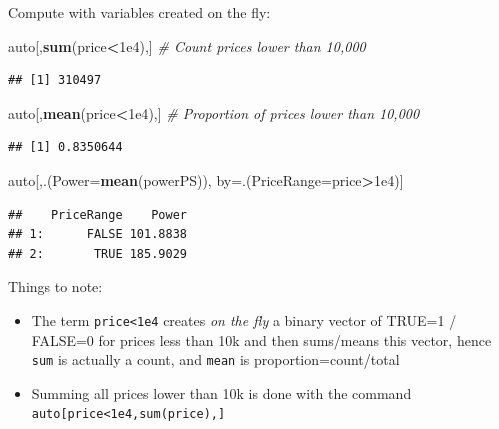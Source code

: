 \documentclass[]{book}
\newenvironment{Shaded}{\begin{snugshade}}{\end{snugshade}}
\newcommand{\KeywordTok}[1]{\textcolor[rgb]{0.13,0.29,0.53}{\textbf{#1}}}
\newcommand{\DataTypeTok}[1]{\textcolor[rgb]{0.13,0.29,0.53}{#1}}
\newcommand{\FloatTok}[1]{\textcolor[rgb]{0.00,0.00,0.81}{#1}}
\newcommand{\CommentTok}[1]{\textcolor[rgb]{0.56,0.35,0.01}{\textit{#1}}}
\newcommand{\OperatorTok}[1]{\textcolor[rgb]{0.81,0.36,0.00}{\textbf{#1}}}
\newcommand{\NormalTok}[1]{#1}
\providecommand{\tightlist}{%
  \setlength{\itemsep}{0pt}\setlength{\parskip}{0pt}}
\theoremstyle{definition}
\theoremstyle{definition}
\theoremstyle{definition}
\theoremstyle{remark}
\begin{document}
Compute with variables created on the fly:

\begin{Shaded}
\begin{Highlighting}[]
\NormalTok{auto[,}\KeywordTok{sum}\NormalTok{(price}\OperatorTok{<}\FloatTok{1e4}\NormalTok{),] }\CommentTok{# Count prices lower than 10,000}
\end{Highlighting}
\end{Shaded}

\begin{verbatim}
## [1] 310497
\end{verbatim}

\begin{Shaded}
\begin{Highlighting}[]
\NormalTok{auto[,}\KeywordTok{mean}\NormalTok{(price}\OperatorTok{<}\FloatTok{1e4}\NormalTok{),] }\CommentTok{# Proportion of prices lower than 10,000}
\end{Highlighting}
\end{Shaded}

\begin{verbatim}
## [1] 0.8350644
\end{verbatim}

\begin{Shaded}
\begin{Highlighting}[]
\NormalTok{auto[,.(}\DataTypeTok{Power=}\KeywordTok{mean}\NormalTok{(powerPS)), by=.(}\DataTypeTok{PriceRange=}\NormalTok{price}\OperatorTok{>}\FloatTok{1e4}\NormalTok{)] }
\end{Highlighting}
\end{Shaded}

\begin{verbatim}
##    PriceRange    Power
## 1:      FALSE 101.8838
## 2:       TRUE 185.9029
\end{verbatim}

Things to note:

\begin{itemize}
\tightlist
\item
  The term \texttt{price\textless{}1e4} creates \emph{on the fly} a
  binary vector of TRUE=1 / FALSE=0 for prices less than 10k and then
  sums/means this vector, hence \texttt{sum} is actually a count, and
  \texttt{mean} is proportion=count/total
\item
  Summing all prices lower than 10k is done with the command
  \texttt{auto{[}price\textless{}1e4,sum(price),{]}}
\end{itemize}
\end{document}
